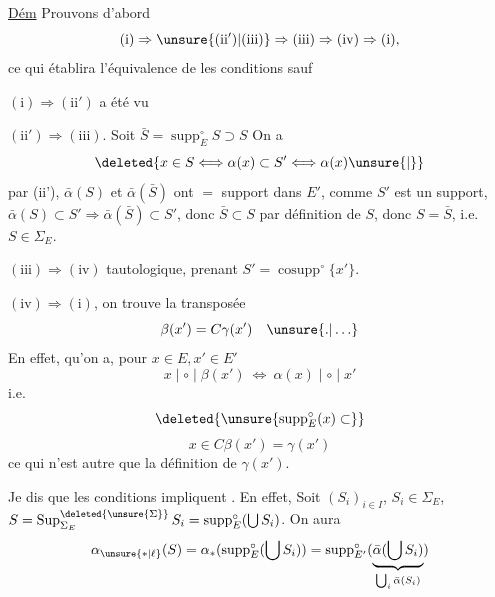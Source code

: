 
\uline{Dém} Prouvons d'abord
\[
(\mathrm{i})\Rightarrow\unsure{(\mathrm{ii}')|(\mathrm{iii})}\Rightarrow(\mathrm{iii})\Rightarrow(\mathrm{iv})\Rightarrow(\mathrm{i}),
\]
ce qui établira l'équivalence de  les conditions sauf 

$(\mathrm{i})\Rightarrow(\mathrm{ii}')$ a été vu

$(\mathrm{ii}')\Rightarrow(\mathrm{iii})$. 
Soit $\bar S=\operatorname{supp}^{\circ}_E S\supset S$ On a
\quad{}
\[
\deleted{x\in S\Longleftrightarrow\alpha(x)\subset S'\Longleftrightarrow\alpha(x)\unsure{\mid}}
\]
par (ii'), $\bar\alpha(S)$ et $\bar\alpha(\bar S)$ ont $=$ support dans $E'$,  comme $S'$ est un support, $\bar\alpha(S)\subset S'\Rightarrow\bar\alpha(\bar S)\subset S'$, donc $\bar S\subset S$ par définition de $S$, donc $S=\bar S$, i.e. $S\in\Sigma_E$.

$(\mathrm{iii})\Rightarrow(\mathrm{iv})$ tautologique, prenant $S'=\operatorname{cosupp}^{\circ}\{x'\}$.

$(\mathrm{iv})\Rightarrow(\mathrm{i})$, on trouve la transposée
\[
\beta(x')=C\gamma(x')\quad\unsure{.|\ldots}
\]
En effet,  qu'on a, pour $x\in E,x'\in E'$
\[
x\mid\circ\mid\beta(x')\ \Longleftrightarrow\ \alpha(x)\mid\circ\mid x'
\]
 i.e.
\[
\deleted{\unsure{\operatorname{supp}^{\circ}_E(x)\subset}}
\]
\[
x\in C\beta(x')=\gamma(x')
\]
ce qui n'est autre que la définition de $\gamma(x')$.

Je dis que les conditions  impliquent . En effet,  Soit $(S_i)_{i\in I}$, $S_i\in\Sigma_E$, $S=\operatorname{Sup}^{\deleted{\unsure{\Sigma}}}_{\Sigma_E}S_i=\operatorname{supp}^{\circ}_E(\bigcup S_i)$. On aura 
\[
\alpha_{\unsure{*|\ell}}(S)=\alpha_*(\operatorname{supp}^{\circ}_E(\bigcup S_i))=\operatorname{supp}^{\circ}_{E'}(\underbrace{\bar\alpha(\bigcup S_i)}_{\bigcup_i\bar\alpha(S_i)})
\]
